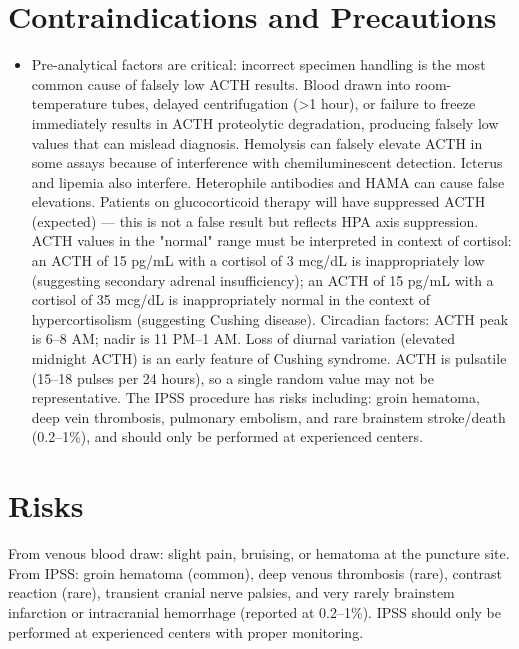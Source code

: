 \section*{Contraindications and Precautions}
\begin{itemize}
  \item Pre-analytical factors are critical: incorrect specimen handling is the most common cause of falsely low ACTH results. Blood drawn into room-temperature tubes, delayed centrifugation (>1 hour), or failure to freeze immediately results in ACTH proteolytic degradation, producing falsely low values that can mislead diagnosis. Hemolysis can falsely elevate ACTH in some assays because of interference with chemiluminescent detection. Icterus and lipemia also interfere. Heterophile antibodies and HAMA can cause false elevations. Patients on glucocorticoid therapy will have suppressed ACTH (expected) --- this is not a false result but reflects HPA axis suppression. ACTH values in the "normal" range must be interpreted in context of cortisol: an ACTH of 15 pg/mL with a cortisol of 3 mcg/dL is inappropriately low (suggesting secondary adrenal insufficiency); an ACTH of 15 pg/mL with a cortisol of 35 mcg/dL is inappropriately normal in the context of hypercortisolism (suggesting Cushing disease). Circadian factors: ACTH peak is 6--8 AM; nadir is 11 PM--1 AM. Loss of diurnal variation (elevated midnight ACTH) is an early feature of Cushing syndrome. ACTH is pulsatile (15--18 pulses per 24 hours), so a single random value may not be representative. The IPSS procedure has risks including: groin hematoma, deep vein thrombosis, pulmonary embolism, and rare brainstem stroke/death (0.2--1\%), and should only be performed at experienced centers.
\end{itemize}
\section*{Risks}
From venous blood draw: slight pain, bruising, or hematoma at the puncture site. From IPSS: groin hematoma (common), deep venous thrombosis (rare), contrast reaction (rare), transient cranial nerve palsies, and very rarely brainstem infarction or intracranial hemorrhage (reported at 0.2--1\%). IPSS should only be performed at experienced centers with proper monitoring.

